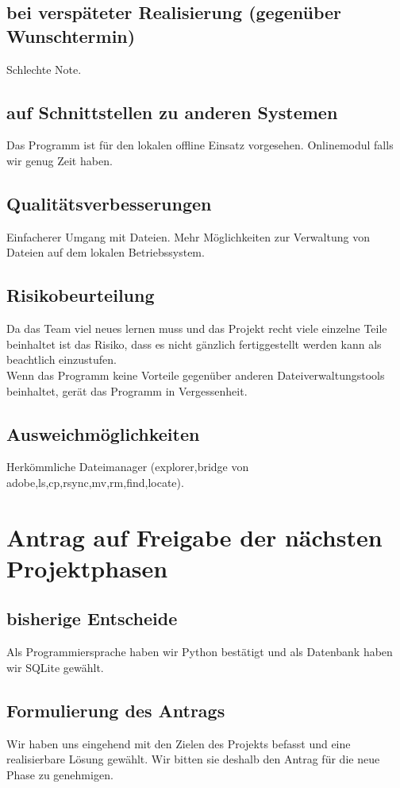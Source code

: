 \documentclass[10pt,paper=a4,final]{scrartcl}
\begin{document}
\subsection{bei verspäteter Realisierung (gegenüber Wunschtermin)}
Schlechte Note.
\subsection{auf Schnittstellen zu anderen Systemen}
Das Programm ist für den lokalen offline Einsatz vorgesehen. Onlinemodul falls wir genug Zeit haben.
\subsection{Qualitätsverbesserungen}
Einfacherer Umgang mit Dateien. Mehr Möglichkeiten zur Verwaltung von Dateien auf dem lokalen Betriebssystem.
\subsection{Risikobeurteilung}
Da das Team viel neues lernen muss und das Projekt recht viele einzelne Teile beinhaltet ist das Risiko, dass es nicht gänzlich fertiggestellt werden kann als beachtlich einzustufen.\\
Wenn das Programm keine Vorteile gegenüber anderen Dateiverwaltungstools beinhaltet, gerät das Programm in Vergessenheit.
\subsection{Ausweichmöglichkeiten}
Herkömmliche Dateimanager (explorer,bridge von adobe,ls,cp,rsync,mv,rm,find,locate).

\section{Antrag auf Freigabe der nächsten Projektphasen}
\subsection{bisherige Entscheide}
Als Programmiersprache haben wir Python bestätigt und als Datenbank haben wir SQLite gewählt.

\subsection{Formulierung des Antrags}
Wir haben uns eingehend mit den Zielen des Projekts befasst und eine realisierbare Lösung gewählt. Wir bitten sie deshalb den Antrag für die neue Phase zu genehmigen.
\end{document}
